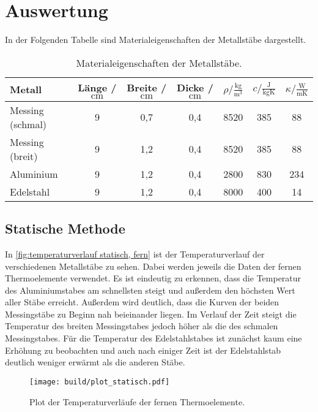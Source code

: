 \section{Auswertung}
\label{sec:Auswertung}
In der Folgenden Tabelle sind Materialeigenschaften der Metallstäbe dargestellt.
\begin{table} [H]
  \centering
  \caption{Materialeigenschaften der Metallstäbe.}
  \label{tab:materialeigenschaften}
  \begin{tabular}{l S[table-format=1.0] S[table-format=1.1] S[table-format=1.1] S[table-format=4.0] S[table-format=3.0] S[table-format=3.0]}
    \toprule
    {Metall} & {Länge / $\unit{\centi\metre}$} & {Breite / $\unit{\centi\metre}$} & %
    {Dicke / $\unit{\centi\metre}$} & {$\rho / \frac{\unit{\kilo\gram}}{\unit{\cubic\metre}}$} &%
     {$c / \frac{\unit{\joule}}{\unit{\kilo\gram\kelvin}}$} & {$\kappa / \frac{\unit{\watt}}{\unit{\metre\kelvin}}$ \cite{czichos}}\\
    \midrule
    Messing (schmal)  & 9 & 0,7 & 0,4 & 8520 & 385 & 88  \\
    Messing (breit)   & 9 & 1,2 & 0,4 & 8520 & 385 & 88  \\
    Aluminium         & 9 & 1,2 & 0,4 & 2800 & 830 & 234 \\
    Edelstahl         & 9 & 1,2 & 0,4 & 8000 & 400 & 14  \\
    \bottomrule
  \end{tabular}
\end{table}

\subsection{Statische Methode}
\label{sec:auswertung statische methode}
In \autoref{fig:temperaturverlauf statisch, fern} ist der Temperaturverlauf der verschiedenen Metallstäbe zu sehen.
Dabei werden jeweils die Daten der fernen Thermoelemente verwendet.
Es ist eindeutig zu erkennen, dass die Temperatur des Aluminiumstabes am schnellsten steigt
und außerdem den höchsten Wert aller Stäbe erreicht. Außerdem wird deutlich, dass die Kurven der beiden Messingstäbe zu Beginn
nah beieinander liegen. Im Verlauf der Zeit steigt die Temperatur des breiten Messingstabes jedoch höher als die des schmalen
Messingstabes. Für die Temperatur des Edelstahlstabes ist zunächst kaum eine Erhöhung zu beobachten und auch nach einiger Zeit
ist der Edelstahlstab deutlich weniger erwärmt als die anderen Stäbe.

\begin{figure} [H]
  \centering
  \texttt{[image: build/plot\_statisch.pdf]}
  \caption{Plot der Temperaturverläufe der fernen Thermoelemente.}
  \label{fig:temperaturverlauf statisch, fern}
\end{figure}

